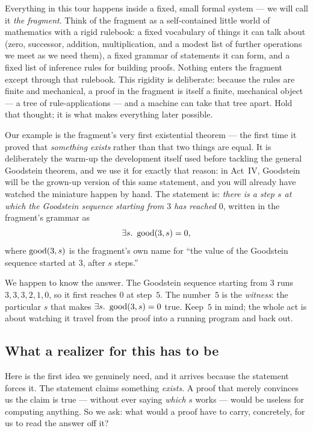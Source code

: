 \documentclass[11pt]{article}
\begin{document}
Everything in this tour happens inside a fixed, small formal system --- we
will call it \emph{the fragment}. Think of the fragment as a self-contained
little world of mathematics with a rigid rulebook: a fixed vocabulary of
things it can talk about (zero, successor, addition, multiplication, and a
modest list of further operations we meet as we need them), a fixed grammar
of statements it can form, and a fixed list of inference rules for building
proofs. Nothing enters the fragment except through that rulebook. This
rigidity is deliberate: because the rules are finite and mechanical, a proof
in the fragment is itself a finite, mechanical object --- a tree of
rule-applications --- and a machine can take that tree apart. Hold that
thought; it is what makes everything later possible.

Our example is the fragment's very first existential theorem --- the first
time it proved that \emph{something exists} rather than that two things are
equal. It is deliberately the warm-up the development itself used before
tackling the general Goodstein theorem, and we use it for exactly that
reason: in Act~IV, Goodstein will be the grown-up version of this same
statement, and you will already have watched the miniature happen by hand.
The statement is: \emph{there is a step $s$ at which the Goodstein sequence
starting from $3$ has reached $0$}, written in the fragment's grammar as
\[
  \exists s.\ \operatorname{good}(3,s)=0,
\]
where $\operatorname{good}(3,s)$ is the fragment's own name for ``the value of the
Goodstein sequence started at $3$, after $s$ steps.''

We happen to know the answer. The Goodstein sequence starting from $3$ runs
$3,3,3,2,1,0$, so it first reaches $0$ at step~$5$. The number~$5$ is the
\emph{witness}: the particular $s$ that makes $\exists s.\ \operatorname{good}(3,s)=0$
true. Keep~$5$ in mind; the whole act is about watching it travel from the
proof into a running program and back out.

\subsection*{What a realizer for this has to be}

Here is the first idea we genuinely need, and it arrives because the
statement forces it. The statement claims something \emph{exists}. A proof
that merely convinces us the claim is true --- without ever saying
\emph{which} $s$ works --- would be useless for computing anything. So we
ask: what would a proof have to carry, concretely, for us to read the answer
off it?
\end{document}
